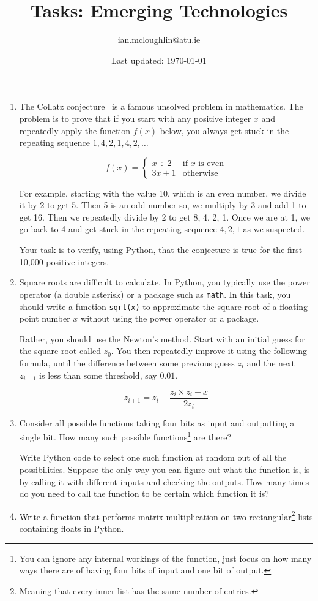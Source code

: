 \documentclass{iansnotes}
\title{Tasks: Emerging Technologies}
\author{ian.mcloughlin@atu.ie}
\date{Last updated: \today}
\begin{document}
 
\maketitle
 
\begin{enumerate}
  \item The Collatz conjecture~\autocite{quantacollatz} is a famous unsolved problem in mathematics. The problem is to prove that if you start with any positive integer $x$ and repeatedly apply the function $f(x)$ below, you always get stuck in the repeating sequence $1,4,2,1,4,2,\ldots$ 
  
  $$ f(x) = \begin{cases}
    x \div 2 & \text{if } x \text{ is even} \\
    3x + 1              & \text{otherwise} 
  \end{cases}$$

  For example, starting with the value 10, which is an even number, we divide it by 2 to get 5.
  Then 5 is an odd number so, we multiply by 3 and add 1 to get 16.
  Then we repeatedly divide by 2 to get 8, 4, 2, 1.
  Once we are at 1, we go back to 4 and get stuck in the repeating sequence $4, 2, 1$ as we suspected.

  Your task is to verify, using Python, that the conjecture is true for the first 10,000 positive integers.
  
  \item Square roots are difficult to calculate. In Python, you typically use the power operator (a double asterisk) or a package such as \texttt{math}. In this task\autocite{golangnewton}, you should write a function \texttt{sqrt(x)} to approximate the square root of a floating point number $x$ without using the power operator or a package.
  
  Rather, you should use the Newton's method\autocite{newtonsqrt}. Start with an initial guess for the square root called $z_0$. You then repeatedly improve it using the following formula, until the difference between some previous guess $z_i$ and the next $z_{i+1}$ is less than some threshold, say $0.01$.
  
  $$ z_{i+1} = z_i -  \frac{z_i \times z_i - x}{2 z_i}$$

  \item Consider all possible functions taking four bits as input and outputting a single bit. How many such possible functions\footnote{You can ignore any internal workings of the function, just focus on how many ways there are of having four bits of input and one bit of output.} are there?
  
  Write Python code to select one such function at random out of all the possibilities. Suppose the only way you can figure out what the function is, is by calling it with different inputs and checking the outputs. How many times do you need to call the function to be certain which function it is?

\item Write a function that performs matrix multiplication on two rectangular\footnote{Meaning that every inner list has the same number of entries.} lists containing floats in Python.

\end{enumerate}
\end{document}
